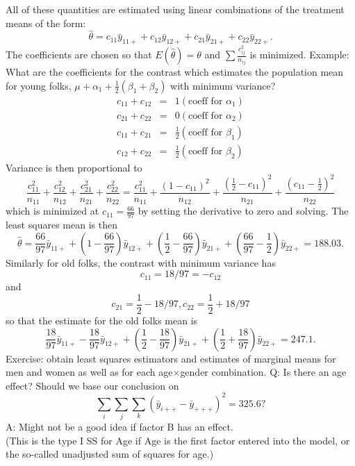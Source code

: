 All of these quantities are estimated using linear combinations of the
treatment means of the form:
$$ \hat\theta = c_{11}\bar{y}_{11+} + c_{12}\bar{y}_{12+}  + c_{21}\bar{y}_{21+}  + c_{22}\bar{y}_{22+}.$$ 
The coefficients are chosen so that $E(\hat\theta)=\theta$ 
and $\sum \frac{c_{ij}^2}{n_{ij}}$ is minimized.
\newpage
\noindent
Example: What are the coefficients for the contrast which estimates
the population mean for young folks, $\mu+\alpha_1 + \frac{1}{2}(\beta_1 + \beta_2)$ with minimum variance?
\begin{eqnarray*}
c_{11} + c_{12} &=& 1 (\mbox{coeff for }\alpha_1)\\
c_{21} + c_{22} &=& 0 (\mbox{coeff for }\alpha_2)\\
c_{11} + c_{21} &=& \frac{1}{2} (\mbox{coeff for }\beta_1) \\
c_{12} + c_{22} &=& \frac{1}{2} (\mbox{coeff for }\beta_2) 
\end{eqnarray*}
Variance is then proportional to
$$ \frac{c_{11}^2}{n_{11}} + \frac{c_{12}^2}{n_{12}} + \frac{c_{21}^2}{n_{21}} + \frac{c_{22}^2}{n_{22}} = \frac{c_{11}^2}{n_{11}} + \frac{(1-c_{11})^2}{n_{12}} + \frac{(\frac{1}{2}-c_{11})^2}{n_{21}} + \frac{(c_{11}-\frac{1}{2})^2}{n_{22}}$$ 
which is minimized at $c_{11}=\frac{66}{97}$ by setting the derivative to zero
and solving.  The least squares mean is then
$$ \hat\theta = \frac{66}{97}\bar{y}_{11+} + (1-\frac{66}{97}) \bar{y}_{12+}  
+(\frac{1}{2}-\frac{66}{97}) \bar{y}_{21+}  +(\frac{66}{97} - \frac{1}{2})\bar{y}_{22+} = 188.03.$$ 
Similarly for old folks, the contrast with minimum variance has
$$c_{11}=18/97=-c_{12}$$ 
and 
$$c_{21}=\frac{1}{2}-18/97,c_{22}=\frac{1}{2}+18/97$$
so that the estimate for the old folks mean is
$$ \frac{18}{97}\bar{y}_{11+} - \frac{18}{97} \bar{y}_{12+}  
+(\frac{1}{2}-\frac{18}{97}) \bar{y}_{21+}  +(\frac{1}{2}+\frac{18}{97} )\bar{y}_{22+} = 247.1.$$
Exercise: obtain least squares estimators and estimates of marginal 
means for men and women as well as for each age$\times$gender combination.
\newpage
\noindent
Q: Is there an age effect?  Should we base our conclusion on 
$$ \sum_i\sum_j\sum_k (\bar{y}_{i++} - \bar{y}_{+++})^2 = 325.6?$$
A: Might not be a good idea if factor B has an effect. \\
(This is the type I SS for Age if Age is the first factor entered 
into the model, or the so-called unadjusted sum of squares for age.) \\
